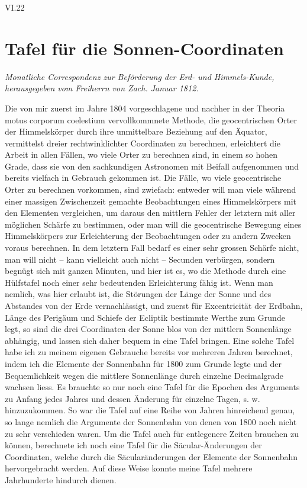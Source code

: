 \documentclass[10pt,a4paper]{article}
\begin{document}
\vspace{1em}
\noindent\textsc{VI.}\hfill 22

\clearpage
\section*{Tafel für die Sonnen-Coordinaten}

\begin{center}
\small
\textit{Monatliche Correspondenz zur Beförderung der Erd- und Himmels-Kunde,}\\
\textit{herausgegeben vom Freiherrn von Zach. Januar 1812.}
\end{center}

\medskip
\noindent
Die von mir zuerst im Jahre 1804 vorgeschlagene und nachher in der Theoria motus corporum coelestium vervollkommnete Methode, die geocentrischen Orter der Himmelskörper durch ihre unmittelbare Beziehung auf den Äquator, vermittelst dreier rechtwinklichter Coordinaten zu berechnen, erleichtert die Arbeit in allen Fällen, wo viele Orter zu berechnen sind, in einem so hohen Grade, dass sie von den sachkundigen Astronomen mit Beifall aufgenommen und bereits vielfach in Gebrauch gekommen ist. Die Fälle, wo viele geocentrische Orter zu berechnen vorkommen, sind zwiefach: entweder will man viele während einer massigen Zwischenzeit gemachte Beobachtungen eines Himmelskörpers mit den Elementen vergleichen, um daraus den mittlern Fehler der letztern mit aller möglichen Schärfe zu bestimmen, oder man will die geocentrische Bewegung eines Himmelskörpers zur Erleichterung der Beobachtungen oder zu andern Zwecken voraus berechnen. In dem letztern Fall bedarf es einer sehr grossen Schärfe nicht, man will nicht -- kann vielleicht auch nicht -- Secunden verbürgen, sondern begnügt sich mit ganzen Minuten, und hier ist es, wo die Methode durch eine Hülfstafel noch einer sehr bedeutenden Erleichterung fähig ist. Wenn man nemlich, was hier erlaubt ist, die Störungen der Länge der Sonne und des Abstandes von der Erde vernachlässigt, und zuerst für Excentricität der Erdbahn, Länge des Perigäum und Schiefe der Ecliptik bestimmte Werthe zum Grunde legt, so sind die drei Coordinaten der Sonne blos von der mittlern Sonnenlänge abhängig, und lassen sich daher bequem in eine Tafel bringen. Eine solche Tafel habe ich zu meinem eigenen Gebrauche bereits vor mehreren Jahren berechnet, indem ich die Elemente der Sonnenbahn für 1800 zum Grunde legte und der Bequemlichkeit wegen die mittlere Sonnenlänge durch einzelne Decimalgrade wachsen liess. Es brauchte so nur noch eine Tafel für die Epochen des Arguments zu Anfang jedes Jahres und dessen Änderung für einzelne Tagen, s. w. hinzuzukommen. So war die Tafel auf eine Reihe von Jahren hinreichend genau, so lange nemlich die Argumente der Sonnenbahn von denen von 1800 noch nicht zu sehr verschieden waren. Um die Tafel auch für entlegenere Zeiten brauchen zu können, berechnete ich noch eine Tafel für die Säcular-Änderungen der Coordinaten, welche durch die Säcularänderungen der Elemente der Sonnenbahn hervorgebracht werden. Auf diese Weise konnte meine Tafel mehrere Jahrhunderte hindurch dienen.
\end{document}
